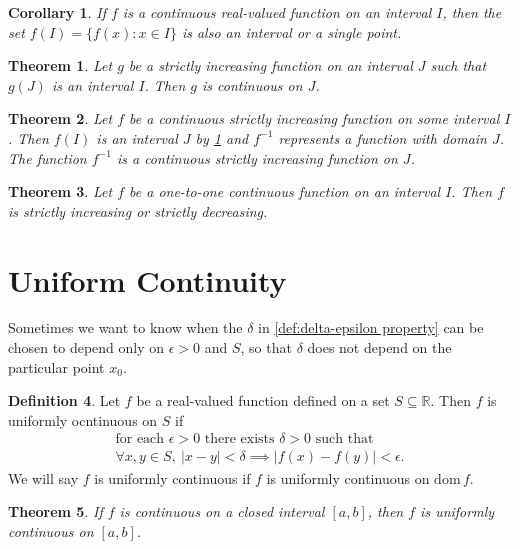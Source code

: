 \documentclass[12pt, lettersize]{book}
\theoremstyle{plain}
\newtheorem{thm}{Theorem}[section]
\newtheorem{cor}{Corollary}[thm]
\theoremstyle{definition}
\newtheorem{dfn}[thm]{Definition}
\theoremstyle{remark}
\newcommand{\R}{\mathbb{R}}
\newcommand{\dom}{\text{dom}\,}
\begin{document}
		\begin{cor}\label{def:18.3}
			If $f$ is a continuous real-valued function on an interval $I$, then the set $f(I)=\{f(x): x\in I\}$ is also
			an interval or a single point.
		\end{cor}
		
		\begin{thm}\label{def:18.5}
			Let $g$ be a strictly increasing function on an interval $J$ such that $g(J)$ is an interval $I$. Then $g$ is
			continuous on $J$.
		\end{thm}
		
		\begin{thm}\label{def:18.4}
			Let $f$ be a continuous strictly increasing function on some interval $I$. Then $f(I)$ is an interval $J$ by \ref{def:18.3} and $f^{-1}$ represents a function with domain $J$. The function $f^{-1}$ is a continuous strictly increasing function on $J$.
		\end{thm}
		
		\setcounter{equation}{0}
		\begin{thm}
			Let $f$ be a \emph{one-to-one} continuous function on an interval $I$. Then $f$ is strictly increasing or strictly decreasing.
		\end{thm}
		\newpage
		
		\section{Uniform Continuity}
		Sometimes we want to know when the $\delta$ in \ref{def:delta-epsilon property} can be chosen to depend only on
		$\epsilon>0$ and $S$, so that $\delta$ does not depend on the particular point $x_0$.
		\begin{dfn}
			Let $f$ be a real-valued function defined on a set $S\subseteq\R$. Then $f$ is uniformly ocntinuous on $S$ if
			\begin{align*}
				\text{for each $\epsilon>0$ there exists $\delta>0$ such that}\\
				\text{$\forall x,y\in S,\ |x-y|<\delta\implies|f(x)-f(y)|<\epsilon.$}
			\end{align*}
			We will say $f$ is uniformly continuous if $f$ is uniformly continuous on $\dom f$.
		\end{dfn}
		
		\begin{thm}\label{def:19.2}
			If $f$ is continuous on a closed interval $[a,b]$, then $f$ is uniformly continuous on $[a,b]$.
		\end{thm}
		
\end{document}
